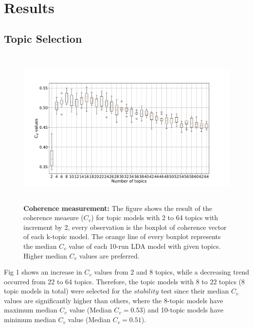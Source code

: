 \section{Results}

\subsection{Topic Selection}

\begin{figure}[H]
    \centering
    \includegraphics[width = 16cm, height = 8cm]{Code/img/topic_selection.pdf}
    \caption[The result of the coherence measurement]{\textbf{Coherence measurement:} The figure shows the result of the coherence measure ($C_v$) for topic models with 2 to 64 topics with increment by 2, every observation is the boxplot of coherence vector of each k-topic model. The orange line of every boxplot represents the median $C_v$ value of each 10-run LDA model with given topics. Higher median $C_v$ values are preferred.}
\end{figure}

Fig 1 shows an increase in $C_v$ values from 2 and 8 topics, while a decreasing trend occurred from 22 to 64 topics. Therefore, the topic models with 8 to 22 topics (8 topic models in total) were selected for the $stability$ test since their median $C_v$ values are significantly higher than others, where the 8-topic models have maximum median $C_v$ value (Median $C_v = 0.53$) and 10-topic models have minimum median $C_v$ value (Median $C_v = 0.51$).

